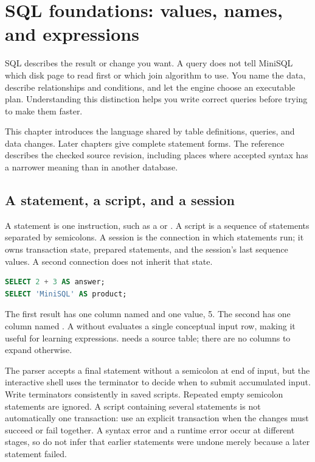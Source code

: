 \chapter{SQL foundations: values, names, and expressions}
\label{sql:foundations}

SQL describes the result or change you want. A query does not tell MiniSQL which disk page to read first or which join algorithm to use. You name the data, describe relationships and conditions, and let the engine choose an executable plan. Understanding this distinction helps you write correct queries before trying to make them faster.

This chapter introduces the language shared by table definitions, queries, and data changes. Later chapters give complete statement forms. The reference describes the checked source revision, including places where accepted syntax has a narrower meaning than in another database.

\section{A statement, a script, and a session}

A statement is one instruction, such as a  or . A script is a sequence of statements separated by semicolons. A session is the connection in which statements run; it owns transaction state, prepared statements, and the session's last sequence values. A second connection does not inherit that state.

\begin{lstlisting}[language=SQL]
SELECT 2 + 3 AS answer;
SELECT 'MiniSQL' AS product;
\end{lstlisting}

The first result has one column named  and one value, 5. The second has one column named . A  without  evaluates a single conceptual input row, making it useful for learning expressions.  needs a source table; there are no columns to expand otherwise.

The parser accepts a final statement without a semicolon at end of input, but the interactive shell uses the terminator to decide when to submit accumulated input. Write terminators consistently in saved scripts. Repeated empty semicolon statements are ignored. A script containing several statements is not automatically one transaction: use an explicit transaction when the changes must succeed or fail together. A syntax error and a runtime error occur at different stages, so do not infer that earlier statements were undone merely because a later statement failed.


